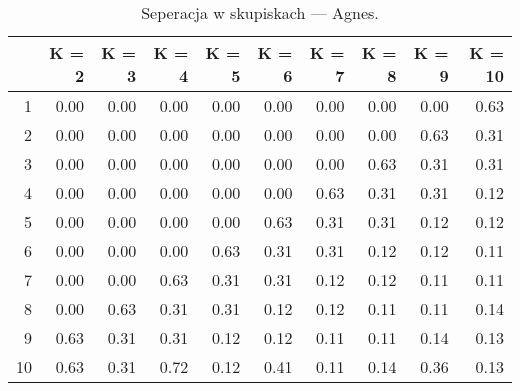 \begin{table}[ht]
\centering
\begin{tabular}{rrrrrrrrrr}
  \hline
 & K = 2 & K = 3 & K = 4 & K = 5 & K = 6 & K = 7 & K = 8 & K = 9 & K = 10 \\ 
  \hline
1 & 0.00 & 0.00 & 0.00 & 0.00 & 0.00 & 0.00 & 0.00 & 0.00 & 0.63 \\ 
  2 & 0.00 & 0.00 & 0.00 & 0.00 & 0.00 & 0.00 & 0.00 & 0.63 & 0.31 \\ 
  3 & 0.00 & 0.00 & 0.00 & 0.00 & 0.00 & 0.00 & 0.63 & 0.31 & 0.31 \\ 
  4 & 0.00 & 0.00 & 0.00 & 0.00 & 0.00 & 0.63 & 0.31 & 0.31 & 0.12 \\ 
  5 & 0.00 & 0.00 & 0.00 & 0.00 & 0.63 & 0.31 & 0.31 & 0.12 & 0.12 \\ 
  6 & 0.00 & 0.00 & 0.00 & 0.63 & 0.31 & 0.31 & 0.12 & 0.12 & 0.11 \\ 
  7 & 0.00 & 0.00 & 0.63 & 0.31 & 0.31 & 0.12 & 0.12 & 0.11 & 0.11 \\ 
  8 & 0.00 & 0.63 & 0.31 & 0.31 & 0.12 & 0.12 & 0.11 & 0.11 & 0.14 \\ 
  9 & 0.63 & 0.31 & 0.31 & 0.12 & 0.12 & 0.11 & 0.11 & 0.14 & 0.13 \\ 
  10 & 0.63 & 0.31 & 0.72 & 0.12 & 0.41 & 0.11 & 0.14 & 0.36 & 0.13 \\ 
   \hline
\end{tabular}
\caption{Seperacja w skupiskach --- Agnes.} 
\label{A1}
\end{table}
